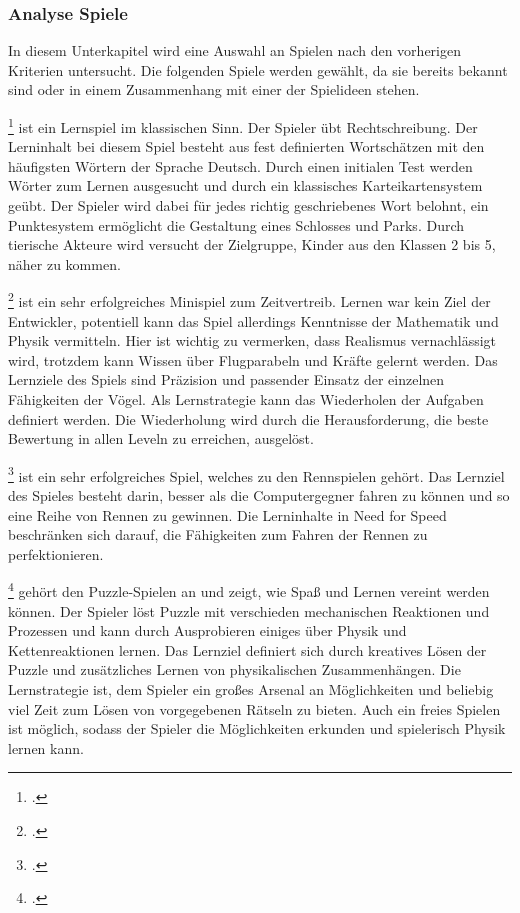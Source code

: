 	\subsubsection{Analyse Spiele}\label{sssec:lernspielanalyse}
		In diesem Unterkapitel wird eine Auswahl an Spielen nach den vorherigen Kriterien untersucht. Die folgenden Spiele werden gewählt, da sie bereits bekannt sind oder in einem Zusammenhang mit einer der Spielideen stehen.
		\begin{description}\obeylines
			\item[Gut]{
				\footcite{game-gut} ist ein Lernspiel im klassischen Sinn. Der Spieler übt Rechtschreibung.
				Der Lerninhalt bei diesem Spiel besteht aus fest definierten Wortschätzen mit den häufigsten Wörtern der Sprache Deutsch.
				Durch einen initialen Test werden Wörter zum Lernen ausgesucht und durch ein klassisches Karteikartensystem geübt. Der Spieler wird dabei für jedes richtig geschriebenes Wort belohnt, ein Punktesystem ermöglicht die Gestaltung eines Schlosses und Parks. Durch tierische Akteure wird versucht der Zielgruppe, Kinder aus den Klassen 2 bis 5, näher zu kommen.
			}
			\item[Angry Birds]{
				\footcite{game-angrybirds} ist ein sehr erfolgreiches Minispiel zum Zeitvertreib. Lernen war kein Ziel der Entwickler, potentiell kann das Spiel allerdings Kenntnisse der Mathematik und Physik vermitteln. Hier ist wichtig zu vermerken, dass Realismus vernachlässigt wird, trotzdem kann Wissen über Flugparabeln und Kräfte gelernt werden.
				Das Lernziele des Spiels sind Präzision und passender Einsatz der einzelnen Fähigkeiten der Vögel.
				Als Lernstrategie kann das Wiederholen der Aufgaben definiert werden. Die Wiederholung wird durch die Herausforderung, die beste Bewertung in allen Leveln zu erreichen, ausgelöst.
			}
			\item[Need for Speed]{
				\footcite{game-nfs} ist ein sehr erfolgreiches Spiel, welches zu den Rennspielen gehört.
				Das Lernziel des Spieles besteht darin, besser als die Computergegner fahren zu können und so eine Reihe von Rennen zu gewinnen.
				Die Lerninhalte in Need for Speed beschränken sich darauf, die Fähigkeiten zum Fahren der Rennen zu perfektionieren.
			}
			\item[Crazy Machines]{
				\footcite{game-crazymachine} gehört den Puzzle-Spielen an und zeigt, wie Spaß und Lernen vereint werden können. Der Spieler löst Puzzle mit verschieden mechanischen Reaktionen und Prozessen und kann durch Ausprobieren einiges über Physik und Kettenreaktionen lernen.
				Das Lernziel definiert sich durch kreatives Lösen der Puzzle und zusätzliches Lernen von physikalischen Zusammenhängen.
				Die Lernstrategie ist, dem Spieler ein großes Arsenal an Möglichkeiten und beliebig viel Zeit zum Lösen von vorgegebenen Rätseln zu bieten. Auch ein freies Spielen ist möglich, sodass der Spieler die Möglichkeiten erkunden und spielerisch Physik lernen kann.
				}
		\end{description}

